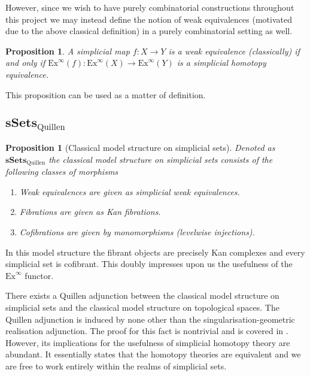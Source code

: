 \documentclass[12pt]{report}
\numberwithin{equation}{section}
\newtheorem{proposition}[dummy]{Proposition}
\begin{document}
	However, since we wish to have purely combinatorial constructions throughout this project we may instead define the notion of weak equivalences (motivated due to the above classical definition) in a purely combinatorial setting as well.
	
	\begin{proposition}
		A simplicial map \( f:X\to Y \) is a weak equivalence (classically) if and only if \( \mathrm{Ex}^\infty (f): \mathrm{Ex}^\infty (X) \to \mathrm{Ex}^\infty (Y)\) is a simplicial homotopy equivalence.
	\end{proposition}
	
	This proposition can be used as a matter of definition.
	
	\subsection{\( \mathbf{sSets}_\mathrm{Quillen} \)}
	\begin{proposition}[Classical model structure on simplicial sets]
		Denoted as \( \mathbf{sSets}_\mathrm{Quillen} \) the classical model structure on simplicial sets consists of the following classes of morphisms
		\begin{enumerate}
			\item Weak equivalences are given as simplicial weak equivalences.
			\item Fibrations are given as Kan fibrations.
			\item Cofibrations are given by monomorphisms (levelwise injections).
		\end{enumerate}
	\end{proposition}
	
	In this model structure the fibrant objects are precisely Kan complexes and every simplicial set is cofibrant. This doubly impresses upon us the usefulness of the \( \mathrm{Ex}^\infty \) functor.
	
	There exists a Quillen adjunction between the classical model structure on simplicial sets and the classical model structure on topological spaces. The Quillen adjunction is induced by none other than the singularisation-geometric realisation adjunction. The proof for this fact is nontrivial and is covered in \cite{quillen1967homotopical}. However, its implications for the usefulness of simplicial homotopy theory are abundant. It essentially states that the homotopy theories are equivalent and we are free to work entirely within the realms of simplicial sets.
	
	
	
\end{document}
